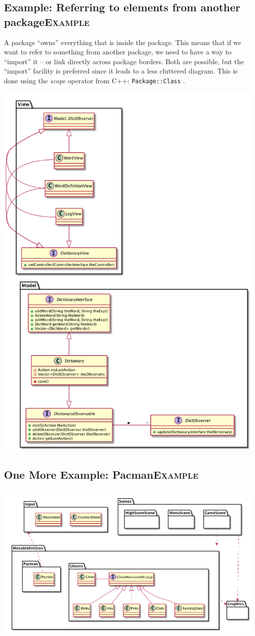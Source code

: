 \documentclass[10pt,t,a4paper]{article}
\begin{document}
\subsection{Example: Referring to elements from another package\hfill{}\textsc{Example}}
\label{sec:orgheadline4}
A package ``owns'' everything that is inside the package. This means that if we want to refer to something from another package, we need to have a way to ``import'' it -- or link directly across package borders. Both are possible, but the ``import'' facility is preferred since it leads to a less cluttered diagram. This is done using the \emph{scope} operator from C++: \texttt{Package::Class} .

\includegraphics[width=.9\linewidth]{FPackageCrossRef.png}

\subsection{One More Example: Pacman\hfill{}\textsc{Example}}
\label{sec:orgheadline5}
\includegraphics[width=.9\linewidth]{FPackagesPacman.png}
\end{document}
